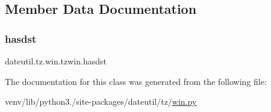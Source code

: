 \subsection{Member Data Documentation}
\mbox{\label{classdateutil_1_1tz_1_1win_1_1tzwin_a91b3b00c3616675579de29ecc430e7f5}} 
\subsubsection{\texorpdfstring{hasdst}{hasdst}}
{\footnotesize\ttfamily dateutil.\+tz.\+win.\+tzwin.\+hasdst}



The documentation for this class was generated from the following file\+:\begin{DoxyCompactItemize}
\item 
venv/lib/python3./site-\/packages/dateutil/tz/\hyperlink{win_8py}{win.\+py}\end{DoxyCompactItemize}
